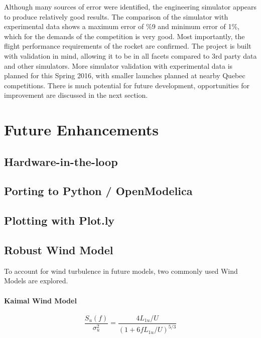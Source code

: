 \documentclass[]{article}
\let\oldparagraph\paragraph
\renewcommand{\paragraph}[1]{\oldparagraph{#1}\mbox{}}
\begin{document}
Although many sources of error were identified, the engineering
simulator appears to produce relatively good results. The comparison of
the simulator with experimental data shows a maximum error of \%9 and
minimum error of 1\%, which for the demands of the competition is very
good. Most importantly, the flight performance requirements of the
rocket are confirmed. The project is built with validation in mind,
allowing it to be in all facets compared to 3rd party data and other
simulators. More simulator validation with experimental data is planned
for this Spring 2016, with smaller launches planned at nearby Quebec
competitions. There is much potential for future development,
opportunities for improvement are discussed in the next section.

\section{Future Enhancements}\label{future-enhancements}

\subsection{Hardware-in-the-loop}\label{hardware-in-the-loop}

\subsection{Porting to Python /
OpenModelica}\label{porting-to-python-openmodelica}

\subsection{Plotting with Plot.ly}\label{plotting-with-plot.ly}

\subsection{Robust Wind Model}\label{robust-wind-model}

To account for wind turbulence in future models, two commonly used Wind
Models are explored.

\paragraph{Kaimal Wind Model}\label{kaimal-wind-model}

\begin{equation}
\label{eq_kaiman_wind_model}
\dfrac{S_u (f)}{\sigma ^2 _ u} = \dfrac{4 L_{1u} / U }{(1+6f L_{1u} / U )^{5/3}}
\end{equation}
\end{document}
